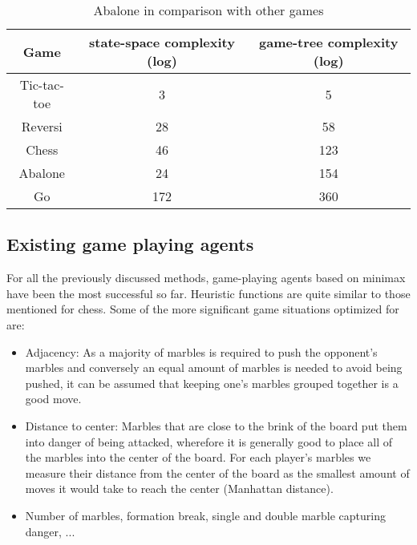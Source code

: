 \begin{table}
    \begin{center}
        \begin{tabular}{ | c | c | c | }
            \hline
            Game        & state-space complexity (log) & game-tree complexity (log) \\
            \hline
            Tic-tac-toe & 3                            & 5                          \\
            \hline
            Reversi     & 28                           & 58                         \\
            \hline
            Chess       & 46                           & 123                        \\
            \hline
            Abalone     & 24                           & 154                        \\
            \hline
            Go          & 172                          & 360                        \\
            \hline
        \end{tabular}
    \end{center}
    \caption{Abalone in comparison with other games \cite{chorus_implementing_2009}}
    \label{complexity_table}
\end{table}

\subsection{Existing game playing agents}
For all the previously discussed methods, game-playing agents based on minimax have been the most successful so far. Heuristic functions are quite similar to those mentioned for chess. Some of the more significant game situations optimized for are:

\begin{itemize}
    \item Adjacency: As a majority of marbles is required to push the opponent's marbles and conversely an equal amount of marbles is needed to avoid being pushed, it can be assumed that keeping one's marbles grouped together is a good move.
    \item Distance to center: Marbles that are close to the brink of the board put them into danger of being attacked, wherefore it is generally good to place all of the marbles into the center of the board. For each player's marbles we measure their distance from the center of the board as the smallest amount of moves it would take to reach the center (Manhattan distance).
    \item Number of marbles, formation break, single and double marble capturing danger, ... \cite[p. 64]{papadopoulos_exploring_2012}
\end{itemize}

